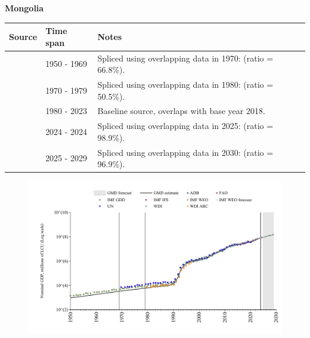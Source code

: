 \documentclass[12pt,a4paper,landscape]{article}
\begin{document}
\begin{adjustbox}{max totalsize={\paperwidth}{\paperheight},center}
\begin{minipage}[t][\textheight][t]{\textwidth}
\vspace*{0.5cm}
{}
\begin{center}
{\Large\bfseries Mongolia}
\end{center}
\vspace{0.5cm}
\begin{table}[H]
\centering
\small
\begin{tabular}{|l|l|l|}
\hline
\textbf{Source} & \textbf{Time span} & \textbf{Notes} \\
\hline
\rowcolor{white}\cite{IMF_GDD}& 1950 - 1969 &Spliced using overlapping data in 1970: (ratio = 66.8\%).\\
\rowcolor{lightgray}\cite{UN}& 1970 - 1979 &Spliced using overlapping data in 1980: (ratio = 50.5\%).\\
\rowcolor{white}\cite{WDI}& 1980 - 2023 &Baseline source, overlaps with base year 2018.\\
\rowcolor{lightgray}\cite{IMF_IFS}& 2024 - 2024 &Spliced using overlapping data in 2025: (ratio = 98.9\%).\\
\rowcolor{white}\cite{IMF_WEO_forecast}& 2025 - 2029 &Spliced using overlapping data in 2030: (ratio = 96.9\%).\\
\hline
\end{tabular}
\end{table}
\begin{figure}[H]
\centering
\includegraphics[width=\textwidth,height=0.6\textheight,keepaspectratio]{graphs/MNG_nGDP.pdf}
\end{figure}
\end{minipage}
\end{adjustbox}
\end{document}
